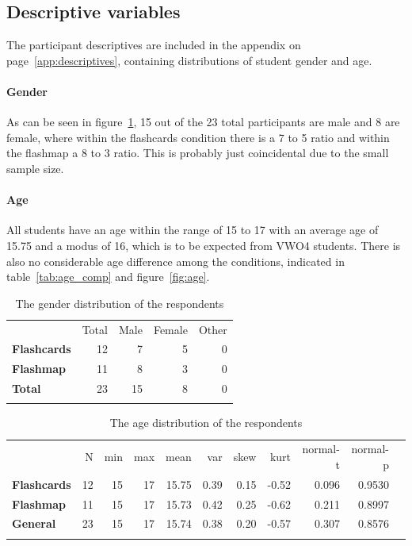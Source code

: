 \subsection{Descriptive variables}

The participant descriptives are included in the  appendix on page~\ref{app:descriptives}, containing distributions of student gender and age.

\paragraph{Gender} As can be seen in figure~\ref{tab:gender}, 15 out of the 23 total participants are male and 8 are female, where within the flashcards condition there is a 7 to 5 ratio and within the flashmap a 8 to 3 ratio. This is probably just coincidental due to the small sample size.

\paragraph{Age} All students have an age within the range of 15 to 17 with an average age of 15.75 and a modus of 16, which is to be expected from VWO4 students. There is also no considerable age difference among the conditions, indicated in table~\ref{tab:age_comp} and figure~\ref{fig:age}.

\begin{table}
    \centering
\begin{tabular}{lrrrr}
\toprule\addlinespace
& Total & Male & Female & Other
\\\addlinespace
\midrule
\textbf{Flashcards} & 12 & 7 & 5 & 0
\\\addlinespace
\textbf{Flashmap} & 11 & 8 & 3 & 0
\\\addlinespace
\textbf{Total} & 23 & 15 & 8 & 0
\\\addlinespace
\bottomrule
\end{tabular}
\caption{The gender distribution of the respondents}
\label{tab:gender}
\end{table}

\begin{table}
\centering
\begin{tabular}{lrrrrrrrrrr}
\toprule\addlinespace
& N & min & max & mean & var & skew & kurt & normal-t & normal-p
\\\addlinespace
\midrule
\textbf{Flashcards} & 12 & 15 & 17 & 15.75 & 0.39 & 0.15 & -0.52 & 0.096
& 0.9530
\\\addlinespace
\textbf{Flashmap} & 11 & 15 & 17 & 15.73 & 0.42 & 0.25 & -0.62 & 0.211 &
0.8997
\\\addlinespace
\textbf{General} & 23 & 15 & 17 & 15.74 & 0.38 & 0.20 & -0.57 & 0.307 &
0.8576
\\\addlinespace
\bottomrule
\end{tabular}
    \caption{The age distribution of the respondents}
    \label{tab:age}
\end{table}

